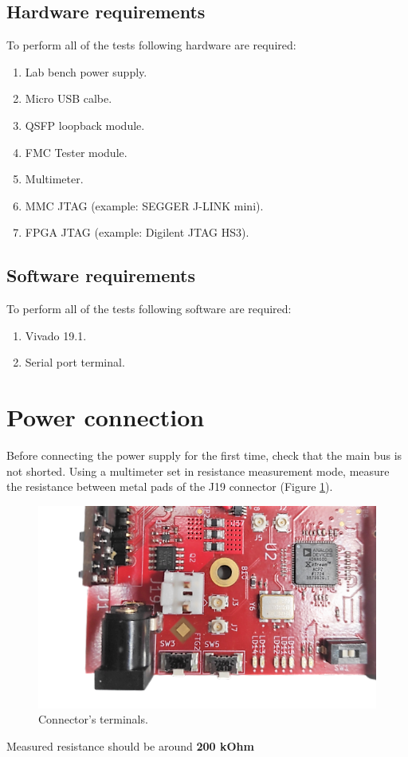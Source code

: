 \documentclass[12pt,oneside,a4]{article}
\begin{document}
\subsection{Hardware requirements}
To perform all of the tests following hardware are required:
\begin{enumerate}
    \item Lab bench power supply.
    \item Micro USB calbe.
    \item QSFP loopback module. 
    \item FMC Tester module. 
    \item Multimeter. 
    \item MMC JTAG (example: SEGGER J-LINK mini).
    \item FPGA JTAG (example: Digilent JTAG HS3).   
\end{enumerate}

\subsection{Software requirements}
To perform all of the tests following software are required:
\begin{enumerate}
    \item Vivado 19.1.
    \item Serial port terminal. 
\end{enumerate}

\section{Power connection}
Before connecting the power supply for the first time, check that the main bus is not shorted. Using a multimeter set in resistance measurement mode, measure the resistance between metal pads of the J19 connector (Figure \ref{01}). 
\begin{figure}[H]
\begin{center}
\includegraphics[width=0.9\linewidth]{J19.png}
 \caption{Connector's terminals. }\label{01}
\end{center}
\end{figure}
\begin{leftbar}
Measured resistance should be around \textbf{{\color{red}200 kOhm}}
\end{leftbar}
\end{document}
